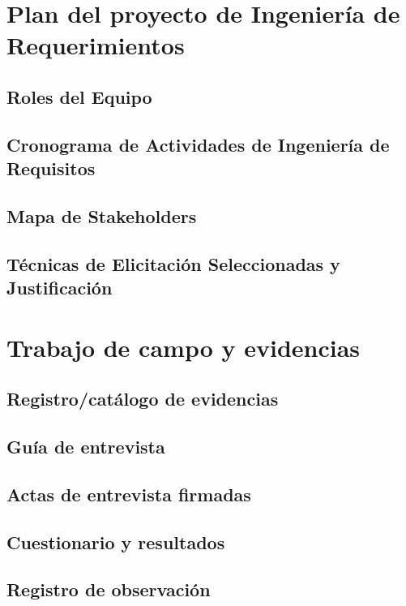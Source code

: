 \documentclass[11pt,a4paper]{article}
\begin{document}
\newpage
\appendix

\section{Plan del proyecto de Ingeniería de Requerimientos}

\subsection{Roles del Equipo}


\subsection{Cronograma de Actividades de Ingeniería de Requisitos}


\subsection{Mapa de Stakeholders}


\subsection{Técnicas de Elicitación Seleccionadas y Justificación}

\section{Trabajo de campo y evidencias}

\subsection{Registro/catálogo de evidencias}

\subsection{Guía de entrevista}

\subsection{Actas de entrevista firmadas}

\subsection{Cuestionario y resultados}

\subsection{Registro de observación}
\end{document}
